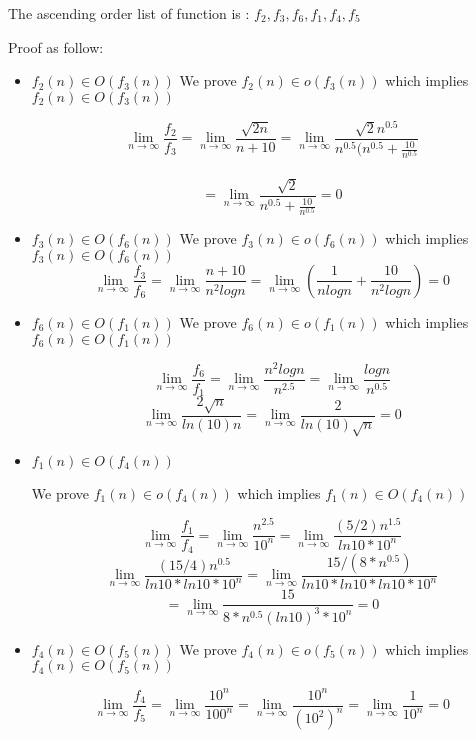 \documentclass{cpsc413Solutions}
\begin{document}
\begin{problemlist}
\begin{problem}
\begin{answer}


The ascending order list of function is : $f_2, f_3, f_6, f_1, f_4, f_5$

Proof as follow:
\begin{itemize}
\item $f_2(n) \in {O}(f_3(n))$
We prove $f_2(n) \in o(f_3(n))$ which implies $f_2(n) \in {O}(f_3(n))$

$$\lim_{n\to\infty}\frac{f_2}{f_3} = \lim_{n\to\infty}\frac{\sqrt{2n}}{n+10} = \lim_{n\to\infty} \frac{\sqrt{2} n^{0.5}}{n^{0.5}(n^{0.5}+\frac{10}{n^{0.5}}} $$\\
$$= \lim_{n\to\infty} \frac{\sqrt{2}}{n^{0.5}+\frac{10}{n^{0.5}}} = 0$$

\item $f_3(n) \in {O}(f_6(n))$
We prove $f_3(n) \in o(f_6(n))$ which implies $f_3(n) \in {O}(f_6(n))$
$$\lim_{n\to\infty}\frac{f_3}{f_6} = \lim_{n\to\infty}\frac{n+10}{n^2 logn } = \lim_{n\to\infty} (\frac{1}{nlogn} + \frac{10}{n^2logn}) = 0 $$

\item $f_6(n) \in {O}(f_1(n))$
We prove $f_6(n) \in o(f_1(n))$ which implies $f_6(n) \in {O}(f_1(n))$

$$\lim_{n\to\infty}\frac{f_6}{f_1} = \lim_{n\to\infty} \frac{n^2logn}{n^{2.5}} = \lim_{n\to\infty} \frac{logn}{n^{0.5}}$$
$$ \lim_{n\to \infty} \frac{2\sqrt{n}}{ln(10)n} =\lim_{n\to \infty} \frac{2}{ln(10)\sqrt n} = 0$$

\item $f_1(n) \in {O}(f_4(n))$

We prove $f_1(n) \in o(f_4(n))$ which implies $f_1(n) \in {O}(f_4(n))$

$$\lim_{n\to\infty}\frac{f_1}{f_4} = \lim_{n\to\infty} \frac{n^{2.5}}{10^n} = \lim_{n\to\infty} \frac{(5/2) n^{1.5}}{ln10*10^n}$$
$$ \lim_{n\to\infty} \frac{(15/4) n^{0.5}}{ln10*ln10*10^n} = \lim_{n\to\infty} \frac{15/(8*n^{0.5})}{ln10*ln10*ln10*10^n} $$
$$= \lim_{n\to\infty} \frac{15}{8*n^{0.5}(ln10)^3*10^n} = 0$$


\item $f_4(n) \in {O}(f_5(n))$
We prove $f_4(n) \in o(f_5(n))$ which implies $f_4(n) \in {O}(f_5(n))$

$$\lim_{n\to\infty}\frac{f_4}{f_5} = \lim_{n\to\infty} \frac{10^n}{100^n} = \lim_{n\to \infty} \frac{10^n}{(10^2)^n} = \lim_{n\to\infty} \frac{1}{10^n} = 0$$


\end{itemize}
\end{answer}
\end{problem}
\end{problemlist}
\end{document}
